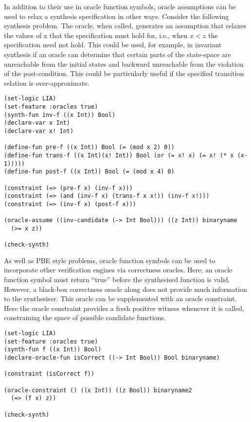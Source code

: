 \documentclass[english,a4paper,10pt]{article}
\begin{document}
\begin{example}
In addition to their use in oracle function symbols, oracle assumptions can be used to relax a synthesis specification in other ways. Consider the following synthesis problem. The oracle, when called, generates an assumption that relaxes the values of x that the specification must hold for, i.e., when $x < z$ the specification need not hold. This could be used, for example, in invariant synthesis if an oracle can determine that certain parts of the state-space are unreachable from the initial states and backward unreachable from the violation of the post-condition. This could be particularly useful if the specified transition relation is over-approximate.

\begin{lstlisting}[language=SyGuS]
(set-logic LIA)
(set-feature :oracles true) 
(synth-fun inv-f ((x Int)) Bool)
(declare-var x Int)
(declare-var x! Int)

(define-fun pre-f ((x Int)) Bool (= (mod x 2) 0))
(define-fun trans-f ((x Int)(x! Int)) Bool (or (= x! x) (= x! (* x (x-1)))))
(define-fun post-f ((x Int)) Bool (= (mod x 4) 0)

(constraint (=> (pre-f x) (inv-f x)))
(constraint (=> (and (inv-f x) (trans-f x x!)) (inv-f x!)))
(constraint (=> (inv-f x) (post-f x)))

(oracle-assume ((inv-candidate (-> Int Bool))) ((z Int)) binaryname
  (>= x z))

(check-synth)
\end{lstlisting}
\end{example}


\begin{example}

As well as PBE style problems, oracle function symbols can be used to incorporate other verification engines via correctness oracles. Here, an oracle function symbol must return ``true'' before the synthesised function is valid. However, a black-box correctness oracle along does not provide much information to the synthesiser. This oracle can be supplemented with an oracle constraint. Here the oracle constraint provides a fresh positive witness whenever it is called, constraining the space of possible candidate functions. 

\begin{lstlisting}[language=SyGuS]
(set-logic LIA)
(set-feature :oracles true) 
(synth-fun f ((x Int)) Bool)
(declare-oracle-fun isCorrect ((-> Int Bool)) Bool binaryname)

(constraint (isCorrect f))

(oracle-constraint () ((x Int)) ((z Bool)) binaryname2
  (=> (f x) z))

(check-synth)
\end{lstlisting}
\end{example}
\end{document}
